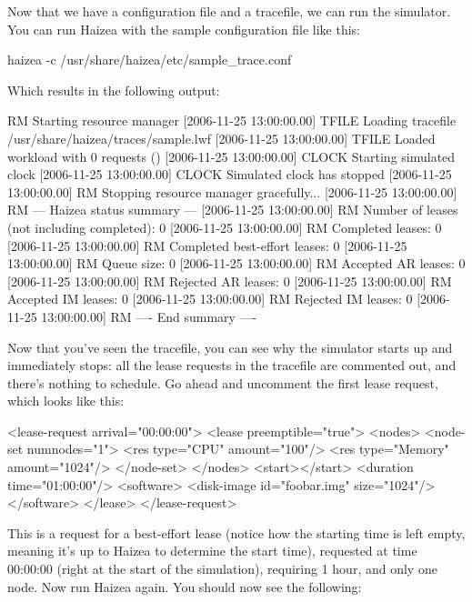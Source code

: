 Now that we have a configuration file and a tracefile, we can run the simulator. You can run Haizea with the sample configuration file like this:

\begin{shellverbatim}
haizea -c /usr/share/haizea/etc/sample_trace.conf 
\end{shellverbatim}

Which results in the following output:

\begin{wideshellverbatim}
[2006-11-25 13:00:00.00] RM      Starting resource manager
[2006-11-25 13:00:00.00] TFILE   Loading tracefile /usr/share/haizea/traces/sample.lwf
[2006-11-25 13:00:00.00] TFILE   Loaded workload with 0 requests ()
[2006-11-25 13:00:00.00] CLOCK   Starting simulated clock
[2006-11-25 13:00:00.00] CLOCK   Simulated clock has stopped
[2006-11-25 13:00:00.00] RM      Stopping resource manager gracefully...
[2006-11-25 13:00:00.00] RM      --- Haizea status summary ---
[2006-11-25 13:00:00.00] RM      Number of leases (not including completed): 0
[2006-11-25 13:00:00.00] RM      Completed leases: 0
[2006-11-25 13:00:00.00] RM      Completed best-effort leases: 0
[2006-11-25 13:00:00.00] RM      Queue size: 0
[2006-11-25 13:00:00.00] RM      Accepted AR leases: 0
[2006-11-25 13:00:00.00] RM      Rejected AR leases: 0
[2006-11-25 13:00:00.00] RM      Accepted IM leases: 0
[2006-11-25 13:00:00.00] RM      Rejected IM leases: 0
[2006-11-25 13:00:00.00] RM      ---- End summary ----
\end{wideshellverbatim}

Now that you've seen the tracefile, you can see why the simulator starts up and immediately stops: all the lease requests in the tracefile are commented out, and there's nothing to schedule. Go ahead and uncomment the first lease request, which looks like this:

\begin{wideshellverbatim}
<lease-request arrival="00:00:00">
<lease preemptible="true">
	<nodes>
		<node-set numnodes="1">
			<res type="CPU" amount="100"/>
			<res type="Memory" amount="1024"/>
		</node-set>
	</nodes>	
	<start></start>
	<duration time="01:00:00"/>
	<software>
		<disk-image id="foobar.img" size="1024"/>
	</software>
</lease>
</lease-request>
\end{wideshellverbatim}

This is a request for a best-effort lease (notice how the starting time is left empty, meaning it's up to Haizea to determine the start time), requested at time 00:00:00 (right at the start of the simulation), requiring 1 hour, and only one node. Now run Haizea again. You should now see the following:

